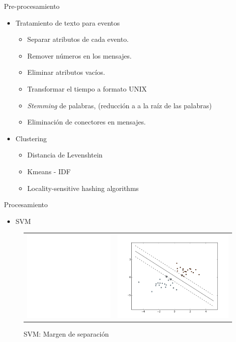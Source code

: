 \documentclass[11pt]{beamer}
\begin{document}
\begin{frame}{Pre-procesamiento}
	\begin{itemize}
		\item Tratamiento de texto para eventos
		\begin{itemize}
			\item Separar atributos de cada evento.
			\item Remover números en los mensajes.
			\item Eliminar atributos vacíos.
			\item Transformar el tiempo a formato UNIX
			\item \textit{Stemming} de palabras, (reducción a a la raíz de las palabras)
			\item Eliminación de conectores en mensajes.
		\end{itemize}
		\item Clustering
		\begin{itemize}
			\item Distancia de Levenshtein
			\item Kmeans - IDF
			\item Locality-sensitive hashing algorithms
		\end{itemize}
	\end{itemize}
\end{frame}


\begin{frame}{Procesamiento}
	\begin{itemize}
		\item SVM
	\end{itemize}
	
	\begin{figure}
	\centering
	\begin{tabular}{ l r }
  		\includegraphics[height=4.5cm]{SVM_margins} &  \includegraphics[height=4.5cm]{SVM_plot_sep} \\
	\end{tabular}
	\caption{SVM: Margen de separación}
	
	\end{figure}
\end{frame}
\end{document}
